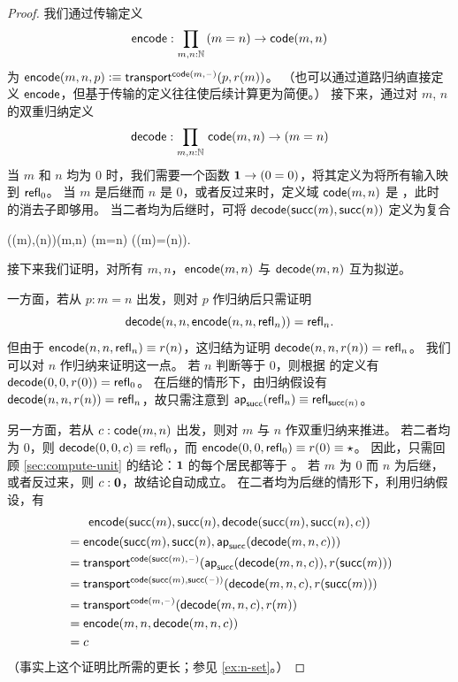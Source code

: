 \begin{proof}
  我们通过传输定义 \[ \encode : \prd{m,n:\N} (m=n) \to \code(m,n) \] 为 $\mathsf{encode}(m,n,p) \vcentcolon\equiv \mathsf{transport}^{\mathsf{code}(m,{\mathord{\hspace{1pt}\text{--}\hspace{1pt}}})}(p,r(m))$。
  （也可以通过道路归纳直接定义 $\mathsf{encode}$，但基于传输的定义往往使后续计算更为简便。）
  接下来，通过对 $m$, $n$ 的双重归纳定义 \[ \decode : \prd{m,n:\N} \code(m,n) \to (m=n) \]
  当 $m$ 和 $n$ 均为 $0$ 时，我们需要一个函数 $\mathbf{1} \to (0=0)$，将其定义为将所有输入映到 $\mathsf{refl}_{0}$。
  当 $m$ 是后继而 $n$ 是 $0$，或者反过来时，定义域 $\mathsf{code}(m,n)$ 是 \emptyt，此时 \emptyt 的消去子即够用。
  当二者均为后继时，可将 $\mathsf{decode}(\mathsf{succ}(m),\mathsf{succ}(n))$ 定义为复合
  \begin{narrowmultline*}
    \code(\suc(m),\suc(n))\jdeq\code(m,n)
     \narrowbreak
    (m=n)
    \xrightarrow{\apfunc{\suc}}
    (\suc(m)=\suc(n)).
  \end{narrowmultline*}
  接下来我们证明，对所有 $m,n$，$\mathsf{encode}(m,n)$ 与 $\mathsf{decode}(m,n)$ 互为拟逆。

  一方面，若从 $p:m=n$ 出发，则对 $p$ 作归纳后只需证明
  \[\mathsf{decode}(n,n,\mathsf{encode}(n,n,\mathsf{refl}_{n}))=\mathsf{refl}_{n}.\]
  但由于 $\mathsf{encode}(n,n,\mathsf{refl}_{n}) \equiv r(n)$，这归结为证明 $\mathsf{decode}(n,n,r(n)) =\mathsf{refl}_{n}$。
  我们可以对 $n$ 作归纳来证明这一点。
  若 $n$ 判断等于 $0$，则根据 \decode 的定义有 $\mathsf{decode}(0,0,r(0)) =\mathsf{refl}_{0}$。
  在后继的情形下，由归纳假设有 $\mathsf{decode}(n,n,r(n)) = \mathsf{refl}_{n}$，故只需注意到 $\mathsf{ap}_{\mathsf{succ}}(\mathsf{refl}_{n}) \equiv \mathsf{refl}_{\mathsf{succ}(n)}$。

  另一方面，若从 $c:\mathsf{code}(m,n)$ 出发，则对 $m$ 与 $n$ 作双重归纳来推进。
  若二者均为 $0$，则 $\mathsf{decode}(0,0,c) \equiv \mathsf{refl}_{0}$，而 $\mathsf{encode}(0,0,\mathsf{refl}_{0})\equiv r(0) \equiv \star$。
  因此，只需回顾 \cref{sec:compute-unit} 的结论：$\mathbf{1}$ 的每个居民都等于 \ttt。
  若 $m$ 为 $0$ 而 $n$ 为后继，或者反过来，则 $c:\mathbf{0}$，故结论自动成立。
  在二者均为后继的情形下，利用归纳假设，有
  \begin{multline*}
    \mathsf{encode}(\mathsf{succ}(m),\mathsf{succ}(n),\mathsf{decode}(\mathsf{succ}(m),\mathsf{succ}(n),c))\\
    \begin{aligned}
    &= \mathsf{encode}(\mathsf{succ}(m),\mathsf{succ}(n),\mathsf{ap}_{\mathsf{succ}}(\mathsf{decode}(m,n,c)))\\
    &= \mathsf{transport}^{\mathsf{code}(\mathsf{succ}(m),{\mathord{\hspace{1pt}\text{--}\hspace{1pt}}})}(\mathsf{ap}_{\mathsf{succ}}(\mathsf{decode}(m,n,c)),r(\mathsf{succ}(m)))\\
    &= \mathsf{transport}^{\mathsf{code}(\mathsf{succ}(m),\mathsf{succ}({\mathord{\hspace{1pt}\text{--}\hspace{1pt}}}))}(\mathsf{decode}(m,n,c),r(\mathsf{succ}(m)))\\
    &= \mathsf{transport}^{\mathsf{code}(m,{\mathord{\hspace{1pt}\text{--}\hspace{1pt}}})}(\mathsf{decode}(m,n,c),r(m))\\
    &= \mathsf{encode}(m,n,\mathsf{decode}(m,n,c))\\
    &= c
  \end{aligned}
  \end{multline*}
  （事实上这个证明比所需的更长；参见 \cref{ex:n-set}。）
\end{proof}

